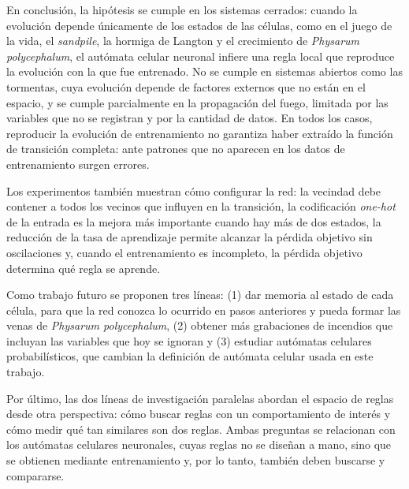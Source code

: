 En conclusión, la hipótesis se cumple en los sistemas cerrados: cuando la evolución depende únicamente de los estados de las células, como en el juego de la vida, el \textit{sandpile}, la hormiga de Langton y el crecimiento de \textit{Physarum polycephalum}, el autómata celular neuronal infiere una regla local que reproduce la evolución con la que fue entrenado. No se cumple en sistemas abiertos como las tormentas, cuya evolución depende de factores externos que no están en el espacio, y se cumple parcialmente en la propagación del fuego, limitada por las variables que no se registran y por la cantidad de datos. En todos los casos, reproducir la evolución de entrenamiento no garantiza haber extraído la función de transición completa: ante patrones que no aparecen en los datos de entrenamiento surgen errores.

Los experimentos también muestran cómo configurar la red: la vecindad debe contener a todos los vecinos que influyen en la transición, la codificación \textit{one-hot} de la entrada es la mejora más importante cuando hay más de dos estados, la reducción de la tasa de aprendizaje permite alcanzar la pérdida objetivo sin oscilaciones y, cuando el entrenamiento es incompleto, la pérdida objetivo determina qué regla se aprende.

Como trabajo futuro se proponen tres líneas: (1) dar memoria al estado de cada célula, para que la red conozca lo ocurrido en pasos anteriores y pueda formar las venas de \textit{Physarum polycephalum}, (2) obtener más grabaciones de incendios que incluyan las variables que hoy se ignoran y (3) estudiar autómatas celulares probabilísticos, que cambian la definición de autómata celular usada en este trabajo.

Por último, las dos líneas de investigación paralelas abordan el espacio de reglas desde otra perspectiva: cómo buscar reglas con un comportamiento de interés y cómo medir qué tan similares son dos reglas. Ambas preguntas se relacionan con los autómatas celulares neuronales, cuyas reglas no se diseñan a mano, sino que se obtienen mediante entrenamiento y, por lo tanto, también deben buscarse y compararse.
